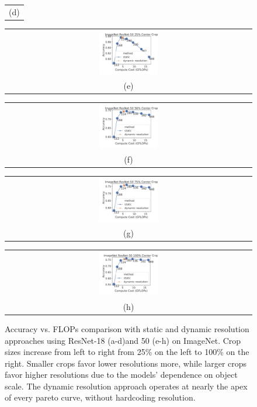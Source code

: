 \begin{figure}[t]
\begin{tabular}{@{}c@{}}
    \small (d)
    \end{tabular}
    \begin{tabular}{@{}c@{}}
    \includegraphics[width=0.245\textwidth]{e2e_figures/imagenet_resnet50_25_center.pdf} \\
    \small (e)
    \end{tabular}
    \begin{tabular}{@{}c@{}}
    \includegraphics[width=0.245\textwidth]{e2e_figures/imagenet_resnet50_56_center.pdf} \\
    \small (f)
    \end{tabular}
    \begin{tabular}{@{}c@{}}
    \includegraphics[width=0.245\textwidth]{e2e_figures/imagenet_resnet50_default_center.pdf} \\
    \small (g)
    \end{tabular}
    \begin{tabular}{@{}c@{}}
    \includegraphics[width=0.245\textwidth]{e2e_figures/imagenet_resnet50_full_center.pdf} \\
    \small (h)
    \end{tabular}
    \caption{Accuracy vs. FLOPs comparison with static and dynamic resolution approaches using ResNet-18 (a-d)and 50 (e-h) on ImageNet. Crop sizes increase from left to right from 25\% on the left to 100\% on the right. Smaller crops favor lower resolutions more, while larger crops favor higher resolutions due to the models' dependence on object scale. The dynamic resolution approach operates at nearly the apex of every pareto curve, without hardcoding resolution.}
    \label{fig:accflops_resnet}
\end{figure}
